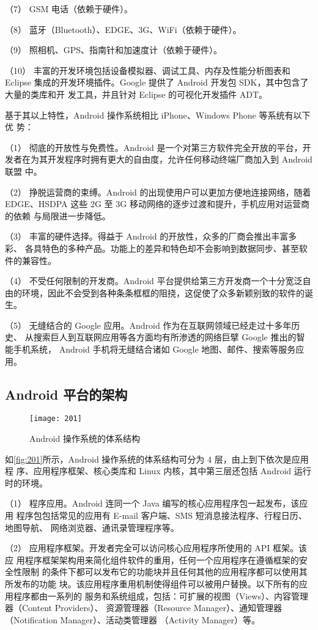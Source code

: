（7） GSM 电话（依赖于硬件）。

（8） 蓝牙（Bluetooth）、EDGE、3G、WiFi（依赖于硬件）。

（9） 照相机、GPS、指南针和加速度计（依赖于硬件）。

（10） 丰富的开发环境包括设备模拟器、调试工具、内存及性能分析图表和 Eclipse
集成的开发环境插件。Google 提供了 Android 开发包 SDK，其中包含了大量的类库和开
发工具，并且针对 Eclipse 的可视化开发插件 ADT。

基于其以上特性，Android 操作系统相比 iPhone、Windows Phone 等系统有以下优
势\cite{5}：

（1） 彻底的开放性与免费性。Android 是一个对第三方软件完全开放的平台，开
发者在为其开发程序时拥有更大的自由度，允许任何移动终端厂商加入到 Android 联盟
中。

（2） 挣脱运营商的束缚。Android 的出现使用户可以更加方便地连接网络，随着
EDGE、HSDPA 这些 2G 至 3G 移动网络的逐步过渡和提升，手机应用对运营商的依赖
与局限进一步降低。

（3） 丰富的硬件选择。得益于 Android 的开放性，众多的厂商会推出丰富多彩、
各具特色的多种产品。功能上的差异和特色却不会影响到数据同步、甚至软件的兼容性。

（4） 不受任何限制的开发商。Android 平台提供给第三方开发商一个十分宽泛自
由的环境，因此不会受到各种条条框框的阻挠，这促使了众多新颖别致的软件的诞生。

（5） 无缝结合的 Google 应用。Android 作为在互联网领域已经走过十多年历史、
从搜索巨人到互联网应用等各方面均有所渗透的网络巨擘 Google 推出的智能手机系统，
Android 手机将无缝结合诸如 Google 地图、邮件、搜索等服务应用。

\subsection{Android 平台的架构}
\begin{figure}[htbp]
    \centering
    \texttt{[image: 201]}
    \caption{\label{fig:201}Android 操作系统的体系结构}
\end{figure}

如\autoref{fig:201}所示，Android 操作系统的体系结构可分为 4 层，由上到下依次是应用程
序、应用程序框架、核心类库和 Linux 内核，其中第三层还包括 Android 运行时的环境。

（1） 程序应用。Android 连同一个 Java 编写的核心应用程序包一起发布，该应用
程序包包括常见的应用有 E-mail 客户端、SMS 短消息接法程序、行程日历、地图导航、
网络浏览器、通讯录管理程序等。

（2） 应用程序框架。开发者完全可以访问核心应用程序所使用的 API 框架。该应
用程序框架架构用来简化组件软件的重用，任何一个应用程序在遵循框架的安全性限制
的条件下都可以发布它的功能块并且任何其他的应用程序都可以使用其所发布的功能
块。该应用程序重用机制使得组件可以被用户替换。以下所有的应用程序都由一系列的
服务和系统组成，包括：可扩展的视图（Views）、内容管理器（Content Providers）、
资源管理器（Resource Manager）、通知管理器（Notification Manager）、活动类管理器
（Activity Manager）等。

